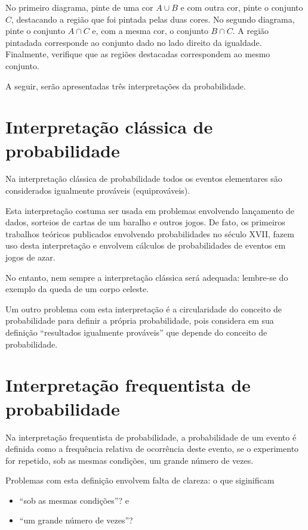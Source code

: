 No primeiro diagrama, pinte de uma cor \(A\cup B\) e com outra cor, pinte o conjunto \(C\), destacando a região que foi pintada pelas duas cores. No segundo diagrama, pinte o conjunto \(A\cap C\) e, com a mesma cor,  o conjunto \(B\cap C\). A região pintadada corresponde ao conjunto dado no lado direito da igualdade. Finalmente, verifique que as regiões destacadas correspondem ao mesmo conjunto.

A seguir, serão apresentadas três interpretações da probabilidade.


\section{Interpretação clássica de probabilidade}

Na interpretação clássica de probabilidade todos os eventos elementares são considerados igualmente prováveis (equiprováveis).

Esta interpretação costuma ser usada em problemas envolvendo lançamento de dados, sorteios de cartas de um baralho e outros jogos. De fato, os primeiros trabalhos teóricos publicados envolvendo probabilidades no século XVII, fazem uso desta interpretação e envolvem cálculos de probabilidades de eventos em jogos de azar.

No entanto, nem sempre a interpretação clássica será adequada: lembre-se do exemplo da queda de um corpo celeste.

Um outro problema com esta interpretação é a circularidade do conceito de probabilidade para definir a própria probabilidade, pois considera em sua definição “resultados igualmente prováveis” que depende do conceito de probabilidade.

\section{Interpretação frequentista de probabilidade}

Na interpretação frequentista de probabilidade, a probabilidade de um evento é definida como a frequência relativa de ocorrência deste evento, se o experimento for repetido, sob as mesmas condições, um grande número de vezes.

Problemas com esta definição envolvem falta de clareza: o que siginificam
\begin{itemize}
\item {} 
“sob as mesmas condições”? e

\item {} 
“um grande número de vezes”?

\end{itemize}

